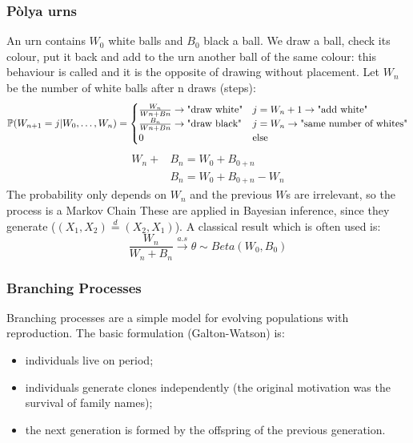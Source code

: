 \documentclass{article}
\begin{document}
\subsubsection*{Pòlya urns}
An urn contains $W_0$ white balls and $B_0$ black a ball. We draw a ball, check its colour, put it back and add to the urn another ball of the same colour: this behaviour is called  and it is the opposite of drawing without placement. Let $W_n$ be the number of white balls after n draws (steps):
\[
\mathbb{P}(W_{n+1}=j|W_0,\ldots,W_n)=\begin{cases}
    \frac{W_n}{Wn+Bn}\rightarrow\text{"draw white"} &j=W_n+1\rightarrow\text{"add white"}\\
    \frac{B_n}{Wn+Bn}\rightarrow\text{"draw black"} &j=W_n\rightarrow\text{"same number of whites"}\\
    0 & \text{else}
\end{cases}
\]
\begin{align*}
    W_n+&B_n=W_0+B_{0+n}\\
    &B_n=W_0+B_{0+n}-W_n
\end{align*}
The probability only depends on $W_n$ and the previous $W$s are irrelevant, so the process is a Markov Chain
These are applied in Bayesian inference, since they generate  ($(X_1, X_2)\stackrel{d}{=}(X_2,X_1)$). A classical result which is often used is:
\[
\frac{W_n}{W_n+B_n}\xrightarrow{a.s}\theta\sim Beta(W_0, B_0)
\]
\subsubsection*{Branching Processes}
Branching processes are a simple model for evolving populations with reproduction. The basic formulation (Galton-Watson) is:
\begin{itemize}
    \item individuals live on period;
    \item individuals generate clones independently (the original motivation was the survival of family names);
    \item the next generation is formed by the offspring of the previous generation.
\end{itemize}
\end{document}
